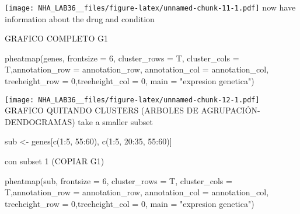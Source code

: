 \documentclass[
]{article}
\newenvironment{Shaded}{\begin{snugshade}}{\end{snugshade}}
\newcommand{\AttributeTok}[1]{\textcolor[rgb]{0.77,0.63,0.00}{#1}}
\newcommand{\DecValTok}[1]{\textcolor[rgb]{0.00,0.00,0.81}{#1}}
\newcommand{\FunctionTok}[1]{\textcolor[rgb]{0.00,0.00,0.00}{#1}}
\newcommand{\NormalTok}[1]{#1}
\newcommand{\OtherTok}[1]{\textcolor[rgb]{0.56,0.35,0.01}{#1}}
\newcommand{\SpecialCharTok}[1]{\textcolor[rgb]{0.00,0.00,0.00}{#1}}
\newcommand{\StringTok}[1]{\textcolor[rgb]{0.31,0.60,0.02}{#1}}
\begin{document}
\texttt{[image: NHA\_LAB36\_\_files/figure-latex/unnamed-chunk-11-1.pdf]}
now have information about the drug and condition

GRAFICO COMPLETO G1

\begin{Shaded}
\begin{Highlighting}[]
\FunctionTok{pheatmap}\NormalTok{(genes, }\AttributeTok{frontsize =} \DecValTok{6}\NormalTok{, }\AttributeTok{cluster\_rows =}\NormalTok{ T, }\AttributeTok{cluster\_cols =}\NormalTok{ T,}\AttributeTok{annotation\_row =}\NormalTok{ annotation\_row, }\AttributeTok{annotation\_col =}\NormalTok{ annotation\_col, }\AttributeTok{treeheight\_row =} \DecValTok{0}\NormalTok{,}\AttributeTok{treeheight\_col =} \DecValTok{0}\NormalTok{, }\AttributeTok{main =} \StringTok{"expresion genetica"}\NormalTok{)}
\end{Highlighting}
\end{Shaded}

\texttt{[image: NHA\_LAB36\_\_files/figure-latex/unnamed-chunk-12-1.pdf]}
GRAFICO QUITANDO CLUSTERS (ARBOLES DE AGRUPACIÓN-DENDOGRAMAS) take a
smaller subset

\begin{Shaded}
\begin{Highlighting}[]
\NormalTok{sub }\OtherTok{\textless{}{-}}\NormalTok{ genes[}\FunctionTok{c}\NormalTok{(}\DecValTok{1}\SpecialCharTok{:}\DecValTok{5}\NormalTok{, }\DecValTok{55}\SpecialCharTok{:}\DecValTok{60}\NormalTok{), }\FunctionTok{c}\NormalTok{(}\DecValTok{1}\SpecialCharTok{:}\DecValTok{5}\NormalTok{, }\DecValTok{20}\SpecialCharTok{:}\DecValTok{35}\NormalTok{, }\DecValTok{55}\SpecialCharTok{:}\DecValTok{60}\NormalTok{)]}
\end{Highlighting}
\end{Shaded}

con subset 1 (COPIAR G1)

\begin{Shaded}
\begin{Highlighting}[]
\FunctionTok{pheatmap}\NormalTok{(sub, }\AttributeTok{frontsize =} \DecValTok{6}\NormalTok{, }\AttributeTok{cluster\_rows =}\NormalTok{ T, }\AttributeTok{cluster\_cols =}\NormalTok{ T,}\AttributeTok{annotation\_row =}\NormalTok{ annotation\_row, }\AttributeTok{annotation\_col =}\NormalTok{ annotation\_col, }\AttributeTok{treeheight\_row =} \DecValTok{0}\NormalTok{,}\AttributeTok{treeheight\_col =} \DecValTok{0}\NormalTok{, }\AttributeTok{main =} \StringTok{"expresion genetica"}\NormalTok{)}
\end{Highlighting}
\end{Shaded}
\end{document}
